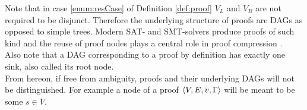 \noindent
Note that in case \ref{enum:resCase} of Definition \ref{def:proof} $V_L$ and $V_R$ are not required to be disjunct. Therefore the underlying structure of proofs are DAGs as opposed to simple trees. Modern SAT- and SMT-solvers produce proofs of such kind \cite{BoutonCaminha-B.-de-OliveiraDeharbeFontaine2009veriT:-an-open-trustable-and-efficient-SMT-Solver,marques2009conflict} and the reuse of proof nodes plays a central role in proof compression \cite{fontaine2011compression}.\\
Also note that a DAG corresponding to a proof by definition has exactly one sink, also called its root node.\\
From hereon, if free from ambiguity, proofs and their underlying DAGs will not be distinguished. For example a node of a proof $\langle V,E,v,\Gamma \rangle$ will be meant to be some $s \in V$.
